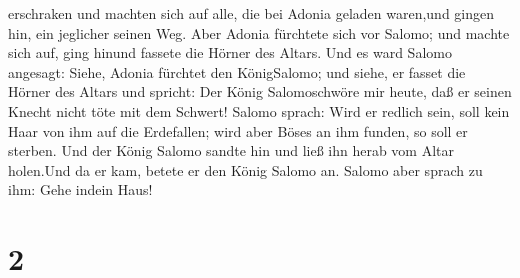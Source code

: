 erschraken und machten sich auf alle, die bei Adonia geladen waren,und
gingen hin, ein jeglicher seinen Weg.  Aber Adonia
fürchtete sich vor Salomo; und machte sich auf, ging hinund fassete die
Hörner des Altars.  Und es ward Salomo angesagt: Siehe,
Adonia fürchtet den KönigSalomo; und siehe, er fasset die Hörner des
Altars und spricht: Der König Salomoschwöre mir heute, daß er seinen
Knecht nicht töte mit dem Schwert!  Salomo sprach: Wird er
redlich sein, soll kein Haar von ihm auf die Erdefallen; wird aber Böses
an ihm funden, so soll er sterben.  Und der König Salomo
sandte hin und ließ ihn herab vom Altar holen.Und da er kam, betete er
den König Salomo an. Salomo aber sprach zu ihm: Gehe indein Haus!

\hypertarget{section-1}{%
\section{2}\label{section-1}}

